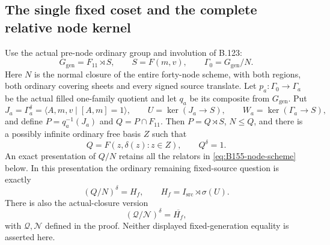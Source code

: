 \subsection*{The single fixed coset and the complete relative node kernel}
\label{stmt:B155}
Use the actual pre-node ordinary group and involution of B.123:
\[
 G_{\mathrm{gen}}=F_{11}\rtimes S,\qquad S=F(m,v),\qquad
 \Gamma_0=G_{\mathrm{gen}}/N.
\]
Here $N$ is the normal closure of the entire forty-node scheme, with
both regions, both ordinary covering sheets and every signed source
translate. Let $p_a:\Gamma_0\to\Gamma_a$ be the actual filled one-family
quotient and let $q_a$ be its composite from $G_{\mathrm{gen}}$. Put
\[
 J_a=\Gamma_a^\delta
 =\langle A,m,v\mid[A,m]=1\rangle,\qquad
 U=\ker(J_a\to S),\qquad W_a=\ker(\Gamma_a\to S),
\]
and define $P=q_a^{-1}(J_a)$ and $Q=P\cap F_{11}$. Then $P=Q\rtimes S$,
$N\le Q$, and there is a possibly infinite ordinary free basis $Z$ such
that
\begin{equation}\label{eq:B155-paired}
 Q=F(z,\delta(z):z\in Z),\qquad Q^\delta=1.
\end{equation}
An exact presentation of $Q/N$ retains all the relators in
\eqref{eq:B155-node-scheme} below. In this presentation the ordinary
remaining fixed-source question is exactly
\[
 (Q/N)^\delta=H_f,
 \qquad H_f=I_{\mathrm{src}}\rtimes\sigma(U).
\]
There is also the actual-closure version
\begin{equation}\label{eq:B155-compact-question}
 (\mathcal Q/\mathcal N)^\delta=\overline{H_f},
\end{equation}
with $\mathcal Q,\mathcal N$ defined in the proof. Neither displayed
fixed-generation equality is asserted here.
